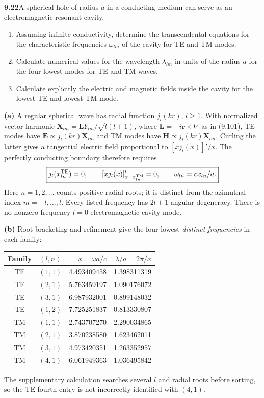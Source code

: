 \par\bigskip
\noindent\textbf{9.22}\quad A spherical hole of radius $a$ in a conducting medium can serve as an electromagnetic resonant cavity.
\begin{enumerate}
\item[(a)] Assuming infinite conductivity, determine the transcendental equations for the characteristic frequencies $\omega_{lm}$ of the cavity for TE and TM modes.
\item[(b)] Calculate numerical values for the wavelength $\lambda_{lm}$ in units of the radius $a$ for the four lowest modes for TE and TM waves.
\item[(c)] Calculate explicitly the electric and magnetic fields inside the cavity for the lowest TE and lowest TM mode.
\end{enumerate}
\solution

\textbf{(a)} A regular spherical wave has radial function $j_l(kr)$,
$l\ge1$. With normalized vector harmonic
$\mathbf X_{lm}=\mathbf L Y_{lm}/\sqrt{l(l+1)}$,
where $\mathbf L=-i\mathbf r\times\nabla$ as in (9.101), TE modes have
$\mathbf E\propto j_l(kr)\mathbf X_{lm}$ and TM modes have
$\mathbf H\propto j_l(kr)\mathbf X_{lm}$. Curling the latter gives a
tangential electric field proportional to $[xj_l(x)]'/x$.
The perfectly conducting boundary therefore requires
\[
\boxed{j_l(x_{ln}^{\rm TE})=0,\qquad
[xj_l(x)]'_{x=x_{ln}^{\rm TM}}=0,\qquad
\omega_{ln}=cx_{ln}/a.}
\]
Here $n=1,2,\ldots$ counts positive radial roots; it is distinct from
the azimuthal index $m=-l,\ldots,l$. Every listed frequency has
$2l+1$ angular degeneracy. There is no nonzero-frequency $l=0$
electromagnetic cavity mode.

\textbf{(b)} Root bracketing and refinement give the four lowest
\emph{distinct frequencies} in each family:
\begin{center}
\begin{tabular}{ccrr}
\toprule
Family&$(l,n)$&$x=\omega a/c$&$\lambda/a=2\pi/x$\\
\midrule
TE&$(1,1)$&4.493409458&1.398311319\\
TE&$(2,1)$&5.763459197&1.090176072\\
TE&$(3,1)$&6.987932001&0.899148032\\
TE&$(1,2)$&7.725251837&0.813330807\\
TM&$(1,1)$&2.743707270&2.290034865\\
TM&$(2,1)$&3.870238580&1.623462011\\
TM&$(3,1)$&4.973420351&1.263352957\\
TM&$(4,1)$&6.061949363&1.036495842\\
\bottomrule
\end{tabular}
\end{center}
The supplementary calculation searches several $l$ and radial roots
before sorting, so the TE fourth entry is not incorrectly identified
with $(4,1)$.

